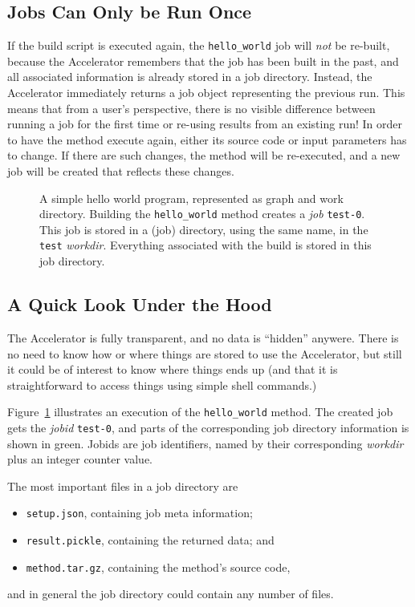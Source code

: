 \subsection{Jobs Can Only be Run Once}
If the build script is executed again, the \texttt{hello\_world} job
will \emph{not} be re-built, because the Accelerator remembers that
the job has been built in the past, and all associated information is
already stored in a job directory.  Instead, the Accelerator
immediately returns a job object representing the previous run.  This
means that from a user's perspective, there is no visible difference
between running a job for the first time or re-using results from an
existing run!  In order to have the method execute again, either its
source code or input parameters has to change.  If there are such
changes, the method will be re-executed, and a new job will be created
that reflects these changes.


\begin{figure}[b!]
  \hspace{1.5cm}
    \caption{A simple hello world program, represented as graph and
      work directory.  Building the \texttt{hello\_world} method
      creates a \emph{job} \texttt{test-0}.  This job is stored in a
      (job) directory, using the same name, in the \texttt{test}
      \emph{workdir}.  Everything associated with the build is stored
      in this job directory.}
    \label{fig:execflow-hello-world}
\end{figure}


\clearpage


\subsection{A Quick Look Under the Hood}
The Accelerator is fully transparent, and no data is ``hidden''
anywere.  There is no need to know how or where things are stored to
use the Accelerator, but still it could be of interest to know where
things ends up (and that it is straightforward to access things using
simple shell commands.)

Figure~\ref{fig:execflow-hello-world} illustrates an execution of the
\texttt{hello\_world} method.  The created job gets the \textsl{jobid}
\texttt{test-0}, and parts of the corresponding job directory
information is shown in green.  Jobids are job identifiers, named by
their corresponding \textsl{workdir} plus an integer counter value.


The most important files in a job directory are
\begin{itemize}
\item[] \texttt{setup.json}, containing job meta information;
\item[] \texttt{result.pickle}, containing the returned data; and
\item[] \texttt{method.tar.gz}, containing the method's source code,
\end{itemize}
and in general the job directory could contain any number of files.

